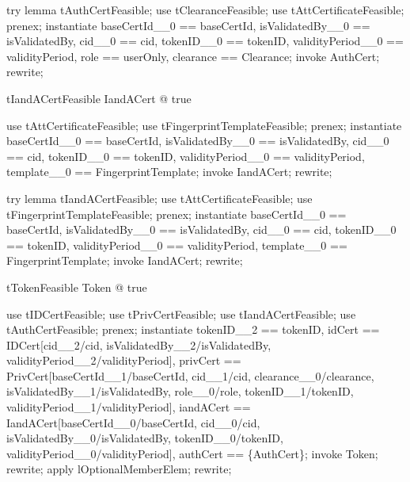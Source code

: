 try lemma tAuthCertFeasible;
use tClearanceFeasible;
use tAttCertificateFeasible;
prenex;
instantiate
  baseCertId\_\_0 == baseCertId, isValidatedBy\_\_0 == isValidatedBy,
  cid\_\_0 == cid, tokenID\_\_0 == tokenID,
  validityPeriod\_\_0 == validityPeriod, role == userOnly,
  clearance == \theta Clearance;
invoke AuthCert;
rewrite;


\begin{theorem}{tIandACertFeasible}
\exists  IandACert @ true
\end{theorem}

\begin{zproof}[tIandACertFeasible]
use tAttCertificateFeasible;
use tFingerprintTemplateFeasible;
prenex;
instantiate baseCertId\_\_0 == baseCertId, isValidatedBy\_\_0 == isValidatedBy, cid\_\_0 == cid, tokenID\_\_0 == tokenID, validityPeriod\_\_0 == validityPeriod, template\_\_0 == \theta  FingerprintTemplate;
invoke IandACert;
rewrite;
\end{zproof}

try lemma tIandACertFeasible;
use tAttCertificateFeasible;
use tFingerprintTemplateFeasible;
prenex;
instantiate
  baseCertId\_\_0 == baseCertId, isValidatedBy\_\_0 == isValidatedBy,
  cid\_\_0 == cid, tokenID\_\_0 == tokenID,
  validityPeriod\_\_0 == validityPeriod,
  template\_\_0 == \theta FingerprintTemplate;
invoke IandACert;
rewrite;


\begin{theorem}{tTokenFeasible}
\exists  Token @ true
\end{theorem}

\begin{zproof}[tTokenFeasible]
use tIDCertFeasible;
use tPrivCertFeasible;
use tIandACertFeasible;
use tAuthCertFeasible;
prenex;
instantiate tokenID\_\_2 == tokenID, idCert == \theta  IDCert[cid\_\_2/cid, isValidatedBy\_\_2/isValidatedBy, validityPeriod\_\_2/validityPeriod], privCert == \theta  PrivCert[baseCertId\_\_1/baseCertId, cid\_\_1/cid, clearance\_\_0/clearance, isValidatedBy\_\_1/isValidatedBy, role\_\_0/role, tokenID\_\_1/tokenID, validityPeriod\_\_1/validityPeriod], iandACert == \theta  IandACert[baseCertId\_\_0/baseCertId, cid\_\_0/cid, isValidatedBy\_\_0/isValidatedBy, tokenID\_\_0/tokenID, validityPeriod\_\_0/validityPeriod], authCert == \{\theta  AuthCert\};
invoke Token;
rewrite;
apply lOptionalMemberElem;
rewrite;
\end{zproof}

